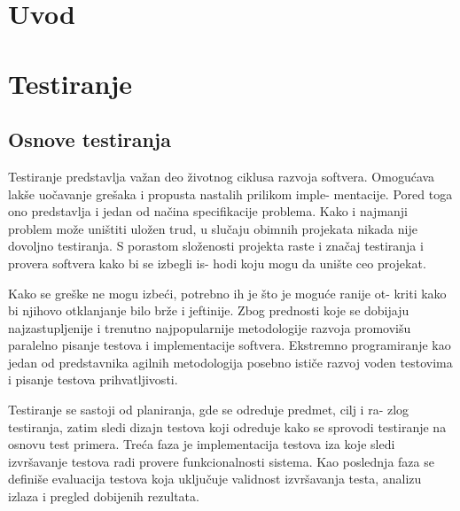 \documentclass[12pt,oneside]{memoir}
\begin{document}
\frontmatter
\naslovna
\komisija
\apstrakt
\tableofcontents*

\mainmatter

\chapter{Uvod}


\chapter{Testiranje}
\section{Osnove testiranja}
Testiranje predstavlja važan deo životnog ciklusa razvoja softvera.
Omogućava lakše uočavanje grešaka i propusta nastalih prilikom imple-
mentacije. Pored toga ono predstavlja i jedan od načina specifikacije
problema. Kako i najmanji problem može uništiti uložen trud, u slučaju
obimnih projekata nikada nije dovoljno testiranja. S porastom složenosti
projekta raste i značaj testiranja i provera softvera kako bi se izbegli is-
hodi koju mogu da unište ceo projekat.
\par 
Kako se greške ne mogu izbeći, potrebno ih je što je moguće ranije ot-
kriti kako bi njihovo otklanjanje bilo brže i jeftinije. Zbog prednosti koje se
dobijaju najzastupljenije i trenutno najpopularnije metodologije razvoja
promovišu paralelno pisanje testova i implementacije softvera. Ekstremno
programiranje kao jedan od predstavnika agilnih metodologija posebno
ističe razvoj voden testovima i pisanje testova prihvatljivosti.\par
Testiranje se sastoji od planiranja, gde se odreduje predmet, cilj i ra-
zlog testiranja, zatim sledi dizajn testova koji odreduje kako se sprovodi
testiranje na osnovu test primera. Treća faza je implementacija testova
iza koje sledi izvršavanje testova radi provere funkcionalnosti sistema.
Kao poslednja faza se definiše evaluacija testova koja uključuje validnost
izvršavanja testa, analizu izlaza i pregled dobijenih rezultata.
\end{document}
